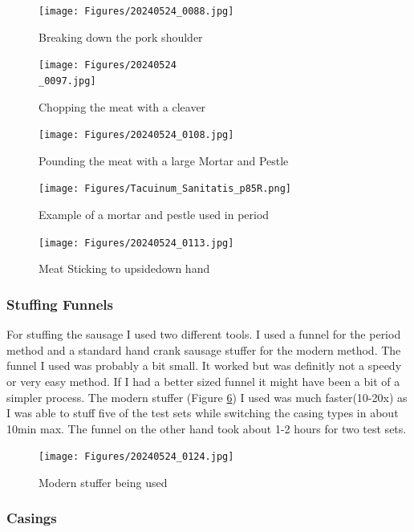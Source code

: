 \documentclass[letterpaper,11pt,leqno]{article}
\begin{document}
 \begin{figure}[!htb]
	\centering
	\texttt{[image: Figures/20240524\_0088.jpg]}
	\caption{Breaking down the pork shoulder}
	\label{Breakdown}
\end{figure}
 \begin{figure}[!htb]
	\centering
	\texttt{[image: Figures/20240524\\\_0097.jpg]}
	\caption{Chopping the meat with a cleaver}
	\label{Chopping}
\end{figure}
 \begin{figure}[!htb]
	\centering
	\texttt{[image: Figures/20240524\_0108.jpg]}
	\caption{Pounding the meat with a large Mortar and Pestle}
	\label{MortarPestle}
\end{figure}
\begin{figure}[!htb]
\centering
\texttt{[image: Figures/Tacuinum\_Sanitatis\_p85R.png]}
\caption{Example of a mortar and pestle used in period \citep{TacSan}}
\label{MortarIlumination}
\end{figure}
 \begin{figure}[!htb]
	\centering
	\texttt{[image: Figures/20240524\_0113.jpg]}
	\caption{Meat Sticking to upsidedown hand}
	\label{sticking}
\end{figure}

\FloatBarrier

\subsubsection{Stuffing Funnels}

For stuffing the sausage I used two different tools. I used a funnel for the period method and a standard hand crank sausage stuffer for the modern method. The funnel I used was probably a bit small. It worked but was definitly not a speedy or very easy method. If I had a better sized funnel it might have been a bit of a simpler process. The modern stuffer (Figure \ref{stuffer}) I used was much faster(10-20x) as I was able to stuff five of the test sets while switching the casing types in about 10min max. The funnel on the other hand took about 1-2 hours for two test sets.

\begin{figure}[!htb]
	\centering
	\texttt{[image: Figures/20240524\_0124.jpg]}
	\caption{Modern stuffer being used}
	\label{stuffer}
\end{figure}

\subsubsection{Casings}
\end{document}

